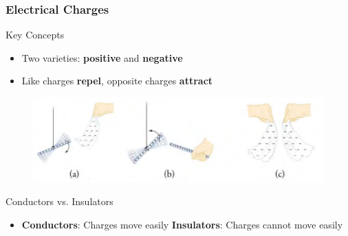 \documentclass{beamer}
\begin{document}
\begin{frame}
    \frametitle{Electrical Charges}
    \begin{block}{Key Concepts}
        \begin{itemize}
                    \item Two varieties: \textbf{positive} and \textbf{negative}
            \item Like charges \textbf{repel}, opposite charges \textbf{attract}
        \end{itemize}
    \end{block}
    
    
        \begin{figure}
            \centering
            \includegraphics[width=1\linewidth]{rere.png}
        \end{figure}
    
    
    \begin{block}{Conductors vs. Insulators}
        \begin{itemize}
            \item \textbf{Conductors}: Charges move easily \textbf{Insulators}: Charges cannot move easily
        \end{itemize}
    \end{block}
\end{frame}
\end{document}
